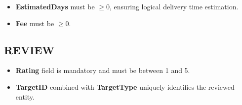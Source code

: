 \begin{itemize}
    \item \textbf{EstimatedDays} must be $\geq 0$, ensuring logical delivery time estimation.
    \item \textbf{Fee} must be $\geq 0$.
\end{itemize}

\subsection{REVIEW}

\begin{itemize}
    \item \textbf{Rating} field is mandatory and must be between 1 and 5.
    \item \textbf{TargetID} combined with \textbf{TargetType} uniquely identifies the reviewed entity.
\end{itemize}